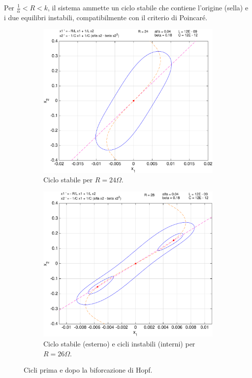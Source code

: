\begin{enumerate}
Per $\frac{1}{\alpha} < R < k$, il sistema ammette un ciclo stabile che contiene l'origine (sella) e i due equilibri instabili, compatibilmente con il criterio di Poincaré.


\begin{figure}
\centering
    \begin{subfigure}[b]{0.8\textwidth}
            \includegraphics[width=\textwidth]{pplane/Cycle24ohm}
            \caption{Ciclo stabile per $R = 24 \Omega$.}
    \end{subfigure}
    \par\bigskip
    \begin{subfigure}[b]{0.8\textwidth}
            \includegraphics[width=\textwidth]{pplane/Cycle26ohm}
            \caption{Ciclo stabile (esterno) e cicli instabili (interni) per $R = 26 \Omega$.}
            \label{fig:hopf}
    \end{subfigure}
    \caption{Cicli prima e dopo la biforcazione di Hopf.}
    \label{fig:cicli-hopf}
\end{figure}


\end{enumerate}
